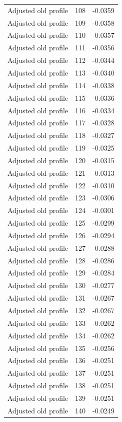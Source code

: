\begin{table}[htbp]
\begin{tabular}{lll}
Adjusted old profile & 108 & -0.0359 \\
Adjusted old profile & 109 & -0.0358 \\
Adjusted old profile & 110 & -0.0357 \\
Adjusted old profile & 111 & -0.0356 \\
Adjusted old profile & 112 & -0.0344 \\
Adjusted old profile & 113 & -0.0340 \\
Adjusted old profile & 114 & -0.0338 \\
Adjusted old profile & 115 & -0.0336 \\
Adjusted old profile & 116 & -0.0334 \\
Adjusted old profile & 117 & -0.0328 \\
Adjusted old profile & 118 & -0.0327 \\
Adjusted old profile & 119 & -0.0325 \\
Adjusted old profile & 120 & -0.0315 \\
Adjusted old profile & 121 & -0.0313 \\
Adjusted old profile & 122 & -0.0310 \\
Adjusted old profile & 123 & -0.0306 \\
Adjusted old profile & 124 & -0.0301 \\
Adjusted old profile & 125 & -0.0299 \\
Adjusted old profile & 126 & -0.0294 \\
Adjusted old profile & 127 & -0.0288 \\
Adjusted old profile & 128 & -0.0286 \\
Adjusted old profile & 129 & -0.0284 \\
Adjusted old profile & 130 & -0.0277 \\
Adjusted old profile & 131 & -0.0267 \\
Adjusted old profile & 132 & -0.0267 \\
Adjusted old profile & 133 & -0.0262 \\
Adjusted old profile & 134 & -0.0262 \\
Adjusted old profile & 135 & -0.0256 \\
Adjusted old profile & 136 & -0.0251 \\
Adjusted old profile & 137 & -0.0251 \\
Adjusted old profile & 138 & -0.0251 \\
Adjusted old profile & 139 & -0.0251 \\
Adjusted old profile & 140 & -0.0249 \\

\end{tabular}
\end{table}
